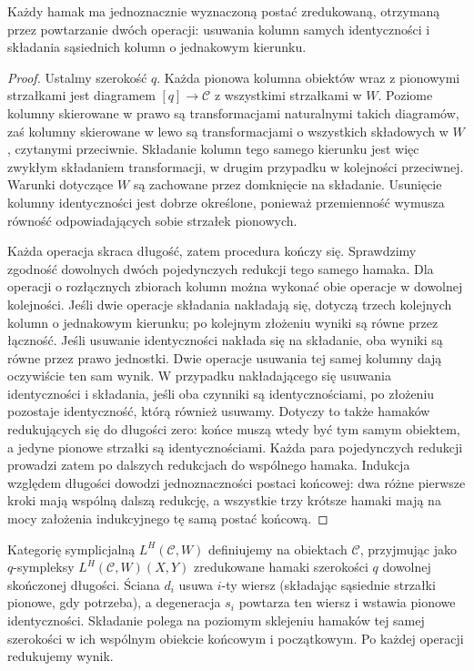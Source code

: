 \begin{lemat}\label{cat:lem:dk-hammock-reduction}
Każdy hamak ma jednoznacznie wyznaczoną postać zredukowaną, otrzymaną przez powtarzanie dwóch operacji: usuwania kolumn samych identyczności i składania sąsiednich kolumn o jednakowym kierunku.
\end{lemat}
\begin{proof}
Ustalmy szerokość $q$. Każda pionowa kolumna obiektów wraz z pionowymi strzałkami jest diagramem $[q]\to\mathcal C$ z wszystkimi strzałkami w $W$. Poziome kolumny skierowane w prawo są transformacjami naturalnymi takich diagramów, zaś kolumny skierowane w lewo są transformacjami o wszystkich składowych w $W$, czytanymi przeciwnie. Składanie kolumn tego samego kierunku jest więc zwykłym składaniem transformacji, w drugim przypadku w kolejności przeciwnej. Warunki dotyczące $W$ są zachowane przez domknięcie na składanie. Usunięcie kolumny identyczności jest dobrze określone, ponieważ przemienność wymusza równość odpowiadających sobie strzałek pionowych.

Każda operacja skraca długość, zatem procedura kończy się. Sprawdzimy zgodność dowolnych dwóch pojedynczych redukcji tego samego hamaka. Dla operacji o rozłącznych zbiorach kolumn można wykonać obie operacje w dowolnej kolejności. Jeśli dwie operacje składania nakładają się, dotyczą trzech kolejnych kolumn o jednakowym kierunku; po kolejnym złożeniu wyniki są równe przez łączność. Jeśli usuwanie identyczności nakłada się na składanie, oba wyniki są równe przez prawo jednostki. Dwie operacje usuwania tej samej kolumny dają oczywiście ten sam wynik. W przypadku nakładającego się usuwania identyczności i składania, jeśli oba czynniki są identycznościami, po złożeniu pozostaje identyczność, którą również usuwamy. Dotyczy to także hamaków redukujących się do długości zero: końce muszą wtedy być tym samym obiektem, a jedyne pionowe strzałki są identycznościami. Każda para pojedynczych redukcji prowadzi zatem po dalszych redukcjach do wspólnego hamaka. Indukcja względem długości dowodzi jednoznaczności postaci końcowej: dwa różne pierwsze kroki mają wspólną dalszą redukcję, a wszystkie trzy krótsze hamaki mają na mocy założenia indukcyjnego tę samą postać końcową.
\end{proof}

\begin{definicja}\label{cat:def:dk-hammock-localization}
Kategorię symplicjalną $L^H(\mathcal C,W)$ definiujemy na obiektach $\mathcal C$, przyjmując jako $q$-sympleksy $L^H(\mathcal C,W)(X,Y)$ zredukowane hamaki szerokości $q$ dowolnej skończonej długości. Ściana $d_i$ usuwa $i$-ty wiersz (składając sąsiednie strzałki pionowe, gdy potrzeba), a degeneracja $s_i$ powtarza ten wiersz i wstawia pionowe identyczności. Składanie polega na poziomym sklejeniu hamaków tej samej szerokości w ich wspólnym obiekcie końcowym i początkowym. Po każdej operacji redukujemy wynik.
\end{definicja}

